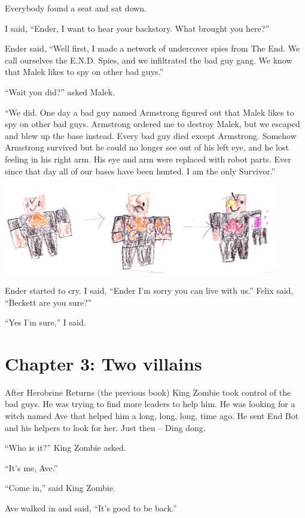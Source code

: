 \documentclass[12pt,oneside]{krantz}
\begin{document}
Everybody found a seat and sat down.

I said, ``Ender, I want to hear your backstory. What brought you here?''

Ender said, ``Well first, I made a network of undercover spies from The
End. We call ourselves the E.N.D. Spies, and we infiltrated the bad guy
gang. We know that Malek likes to spy on other bad guys.''

``Wait you did?'' asked Malek.

``We did. One day a bad guy named Armstrong figured out that Malek likes
to spy on other bad guys. Armstrong ordered me to destroy Malek, but we
escaped and blew up the base instead. Every bad guy died except
Armstrong. Somehow Armstrong survived but he could no longer see out of
his left eye, and he lost feeling in his right arm. His eye and arm were
replaced with robot parts. Ever since that day all of our bases have
been hunted. I am the only Survivor.''

\includegraphics[width=4.6875in,height=\textheight]{img/armstrong.jpg}

Ender started to cry. I said, ``Ender I'm sorry you can live with us.''
Felix said, ``Beckett are you sure?''

``Yes I'm sure,'' I said.

\hypertarget{chapter-3-two-villains}{%
\chapter*{Chapter 3: Two villains}\label{chapter-3-two-villains}}


After Herobrine Returns (the previous book) King Zombie took control of
the bad guys. He was trying to find more leaders to help him. He was
looking for a witch named Ave that helped him a long, long, long, time
ago. He sent End Bot and his helpers to look for her. Just then -- Ding
dong.

``Who is it?'' King Zombie asked.

``It's me, Ave.''

``Come in,'' said King Zombie.

Ave walked in and said, ``It's good to be back.''
\end{document}
